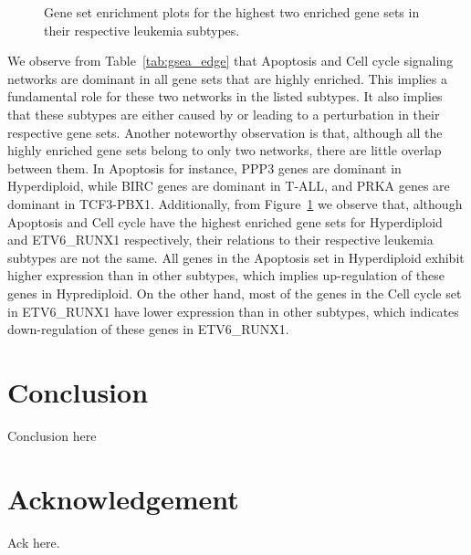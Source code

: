\documentclass[runningheads,a4paper]{llncs}
\newcommand{\goodgap}{
        \hspace{\subfigtopskip}
        \hspace{\subfigbottomskip}}
\begin{document}
\begin{figure}[t]
\centering
{}
\goodgap
{}
\caption{Gene set enrichment plots for the highest two enriched gene sets in
their respective leukemia subtypes.}
\label{fig:gsea_edge}
\end{figure}

We observe from Table~\ref{tab:gsea_edge} that Apoptosis and Cell cycle
signaling networks are dominant in all gene sets that are highly enriched. This
implies a fundamental role for these two networks in the listed subtypes. It
also implies that these subtypes are either caused by or leading to a
perturbation in their respective gene sets. Another noteworthy observation is
that, although all the highly enriched gene sets belong to only two networks,
there are little overlap between them. In Apoptosis for instance, PPP3 genes are
dominant in Hyperdiploid, while BIRC genes are dominant in T-ALL, and PRKA genes
are dominant in TCF3-PBX1. Additionally, from Figure~\ref{fig:gsea_edge} we
observe that, although Apoptosis and Cell cycle have the highest enriched gene
sets for Hyperdiploid and ETV6\_RUNX1 respectively, their relations to their
respective leukemia subtypes are not the same. All genes in the Apoptosis set in
Hyperdiploid exhibit higher expression than in other subtypes, which implies
up-regulation of these genes in Hyprediploid. On the other hand, most of the
genes in the Cell cycle set in ETV6\_RUNX1 have lower expression than in other
subtypes, which indicates down-regulation of these genes in ETV6\_RUNX1.

\section{Conclusion}
\label{sec:conc}

Conclusion here

\section*{Acknowledgement}
Ack here.

%

\end{document}
